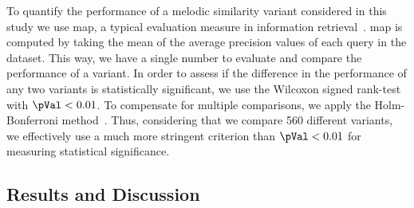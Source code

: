 To quantify the performance of a melodic similarity variant considered in this study we use \acrfull{map}, a typical evaluation measure in information retrieval~\citep{manning2008introduction}. \Gls{map} is computed by taking the mean of the average precision values of each query in the dataset. This way, we have a single number to evaluate and compare the performance of a variant. In order to assess if the difference in the performance of any two variants is statistically significant, we use the Wilcoxon signed rank-test~\citep{wilcoxon1945individual} with $\pVal < 0.01$. To compensate for multiple comparisons, we apply the Holm-Bonferroni method~\citep{holm1979simple}. Thus, considering that we compare 560 different variants, we effectively use a much more stringent criterion than $\pVal < 0.01$ for measuring statistical significance.


\subsection{Results and Discussion}
\label{sec:patterns_melodic_similarity_results_discussions}


